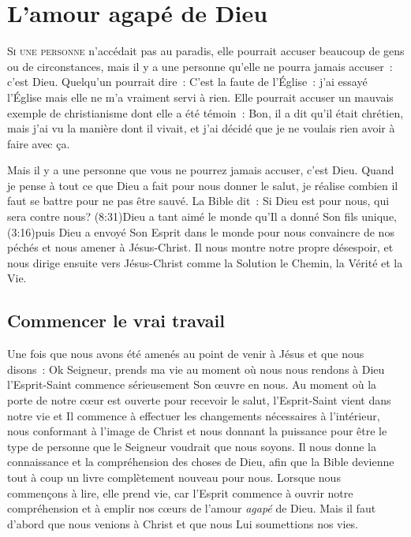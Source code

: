 \chapter{L'amour agap\'e de Dieu}

\lettrine{S}{i une personne} n'accédait pas au paradis,
 elle pourrait accuser beaucoup de gens
 ou de circonstances, mais il y a une personne
 qu'elle ne pourra jamais accuser~: c'est Dieu.
 Quelqu'un pourrait dire~:
 \og C'est la faute de l'Église~: j'ai essayé l'Église mais
 elle ne m'a vraiment servi à rien. \fg{}
 Elle pourrait accuser un mauvais exemple de christianisme
 dont elle a été témoin~:
 \og Bon, il a dit qu'il était chrétien, mais j'ai vu la manière
 dont il vivait, et j'ai décidé que je ne voulais rien avoir à faire
 avec ça. \fg{}

Mais il y a une personne que vous ne pourrez jamais accuser, c'est Dieu.
 Quand je pense à tout ce que Dieu a fait pour nous donner le salut,
 je réalise combien il faut se battre pour ne pas être sauvé.
 La Bible dit~:
 \og Si Dieu est pour nous, qui sera contre nous? \fg{}
 (8:31)Dieu a tant aimé le monde qu'Il a donné
 Son fils unique, (3:16)puis Dieu a envoyé Son Esprit
 dans le monde pour nous convaincre
 de nos péchés et nous amener à Jésus-Christ.
 Il nous montre notre propre désespoir, et nous dirige ensuite
 vers Jésus-Christ comme la Solution \ocadr le Chemin, la Vérité et la Vie.

\section{Commencer le vrai travail}

Une fois que nous avons été amenés au point de venir à Jésus
 et que nous disons~:
 \og Ok Seigneur, prends ma vie \fg{}
 \ocadr au moment où nous nous rendons à Dieu \fcadr
 l'Esprit-Saint commence sérieusement Son œuvre en nous.
 Au moment où la porte de notre cœur est ouverte pour recevoir le salut,
 l'Esprit-Saint vient dans notre vie et Il commence à effectuer
 les changements nécessaires à l'intérieur, nous conformant
 à l'image de Christ et nous donnant la puissance pour être
 le type de personne que le Seigneur voudrait que nous soyons.
 Il nous donne la connaissance et la compréhension des choses de Dieu,
 afin que la Bible devienne tout à coup un livre complètement
 nouveau pour nous. Lorsque nous commençons à lire,
 elle prend vie, car l'Esprit commence à ouvrir notre compréhension
 et à emplir nos cœurs de l'amour \emph{agapé} de Dieu.
 Mais il faut d'abord que nous venions à Christ
 et que nous Lui soumettions nos vies.

